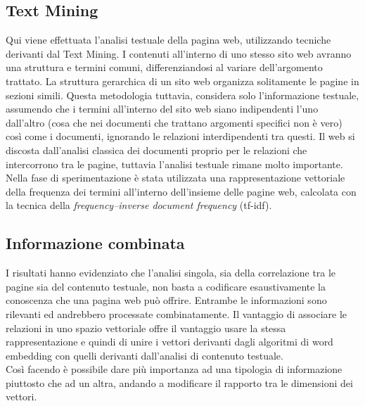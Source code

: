 \subsection{Text Mining}
Qui viene effettuata l'analisi testuale della pagina web, utilizzando tecniche derivanti dal Text Mining. I contenuti all'interno di uno stesso sito web avranno una struttura e termini comuni, differenziandosi al variare dell'argomento trattato. La struttura gerarchica di un sito web organizza solitamente le pagine in sezioni simili. Questa metodologia tuttavia, considera solo l'informazione testuale, assumendo che i termini all'interno del sito web siano indipendenti l'uno dall'altro (cosa che nei documenti che trattano argomenti specifici non è vero) così come i documenti, ignorando le relazioni interdipendenti tra questi. Il web si discosta dall'analisi classica dei documenti proprio per le relazioni che intercorrono tra le pagine, tuttavia l'analisi testuale rimane molto importante.
\\
Nella fase di sperimentazione è stata utilizzata una rappresentazione vettoriale della frequenza dei termini all'interno dell'insieme delle pagine web, calcolata con la tecnica della \textit{frequency–inverse document frequency} (tf-idf).

\subsection{Informazione combinata}
I risultati hanno evidenziato che l'analisi singola, sia della correlazione tra le pagine sia del contenuto testuale, non basta a codificare esaustivamente la conoscenza che una pagina web può offrire. Entrambe le informazioni sono rilevanti ed andrebbero processate combinatamente. Il vantaggio di associare le relazioni in uno spazio vettoriale offre il vantaggio usare la stessa rappresentazione e quindi di unire i vettori derivanti dagli algoritmi di word embedding con quelli derivanti dall'analisi di contenuto testuale. 
\\
Così facendo è possibile dare più importanza ad una tipologia di informazione piuttosto che ad un altra, andando a modificare il rapporto tra le dimensioni dei vettori.
